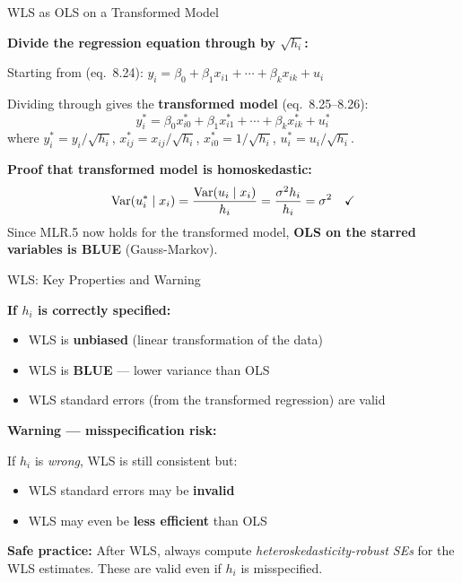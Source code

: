 \documentclass[aspectratio=169, 12pt]{beamer}
\begin{document}
\begin{frame}{WLS as OLS on a Transformed Model}

  \textbf{Divide the regression equation through by $\sqrt{h_i}$:}

  Starting from (eq.\ 8.24): $y_i = \beta_0 + \beta_1 x_{i1} + \cdots + \beta_k x_{ik} + u_i$

  \smallskip

  Dividing through gives the \textbf{transformed model} (eq.\ 8.25--8.26):
  \[
    y_i^* = \beta_0 x_{i0}^* + \beta_1 x_{i1}^* + \cdots + \beta_k x_{ik}^* + u_i^*
  \]
  where $y_i^* = y_i/\sqrt{h_i}$, \; $x_{ij}^* = x_{ij}/\sqrt{h_i}$, \; $x_{i0}^* = 1/\sqrt{h_i}$, \; $u_i^* = u_i/\sqrt{h_i}$.

  \smallskip

  \begin{highlightbox}
    \textbf{Proof that transformed model is homoskedastic:}
    \[
      \operatorname{Var}(u_i^* \mid x_i) = \frac{\operatorname{Var}(u_i \mid x_i)}{h_i} = \frac{\sigma^2 h_i}{h_i} = \sigma^2
      \quad \checkmark
    \]
    Since MLR.5 now holds for the transformed model, \textbf{OLS on the starred variables is BLUE} (Gauss-Markov).
  \end{highlightbox}

\end{frame}

\begin{frame}{WLS: Key Properties and Warning}

  \begin{highlightbox}
    \textbf{If $h_i$ is correctly specified:}
    \begin{itemize}
      \item WLS is \textbf{unbiased} (linear transformation of the data)
      \item WLS is \textbf{BLUE} — lower variance than OLS
      \item WLS standard errors (from the transformed regression) are valid
    \end{itemize}
  \end{highlightbox}

  \smallskip

  \begin{keybox}
    \textbf{Warning — misspecification risk:}

    If $h_i$ is \textit{wrong}, WLS is still consistent but:
    \begin{itemize}
      \item WLS standard errors may be \textbf{invalid}
      \item WLS may even be \textbf{less efficient} than OLS
    \end{itemize}
    \textbf{Safe practice:} After WLS, always compute \textit{heteroskedasticity-robust SEs} for the WLS estimates. These are valid even if $h_i$ is misspecified.
  \end{keybox}

\end{frame}
\end{document}
